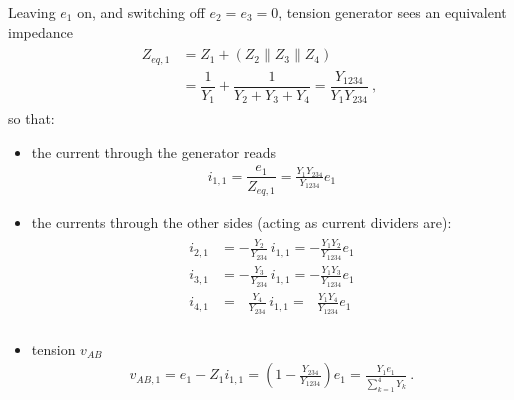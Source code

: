 \documentclass[letterpaper,10pt,italian]{jupyterBook}
\begin{document}
\sphinxAtStartPar
{} Leaving \(e_1\) on, and switching off \(e_2 = e_3 = 0\), tension generator sees an equivalent impedance
\begin{equation*}
\begin{split}\begin{aligned}
  Z_{eq,1}
  & = Z_1 + (Z_2 \parallel Z_3 \parallel Z_4) \\
  & = \dfrac{1}{Y_1} + \dfrac{1}{Y_2 + Y_3 + Y_4} = \dfrac{Y_{1234}}{Y_1 Y_{234}}  \ ,
\end{aligned}\end{split}
\end{equation*}
\sphinxAtStartPar
so that:
\begin{itemize}
\item {} 
\sphinxAtStartPar
the current through the generator reads
\begin{equation*}
\begin{split}i_{1,1} = \dfrac{e_1}{Z_{eq,1}} = \frac{Y_1 Y_{234}}{Y_{1234}} e_1\end{split}
\end{equation*}
\item {} 
\sphinxAtStartPar
the currents through the other sides (acting as current dividers are):
\begin{equation*}
\begin{split}\begin{aligned}
      i_{2,1} & = -     \frac{Y_2}{Y_{234}} \, i_{1,1} = -     \frac{Y_1 Y_2}{Y_{1234}} e_1  \\
      i_{3,1} & = -     \frac{Y_3}{Y_{234}} \, i_{1,1} = -     \frac{Y_1 Y_3}{Y_{1234}} e_1  \\
      i_{4,1} & = \ \ \ \frac{Y_4}{Y_{234}} \, i_{1,1} = \ \ \ \frac{Y_1 Y_4}{Y_{1234}} e_1  \\
   \end{aligned}\end{split}
\end{equation*}
\item {} 
\sphinxAtStartPar
tension \(v_{AB}\)
\begin{equation*}
\begin{split}v_{AB,1} = e_1 - Z_1 i_{1,1} = \left( 1 - \frac{Y_{234}}{Y_{1234}} \right) e_1 = \frac{Y_1 e_1}{\sum_{k=1}^4 Y_k} \ . \end{split}
\end{equation*}
\end{itemize}
\end{document}
